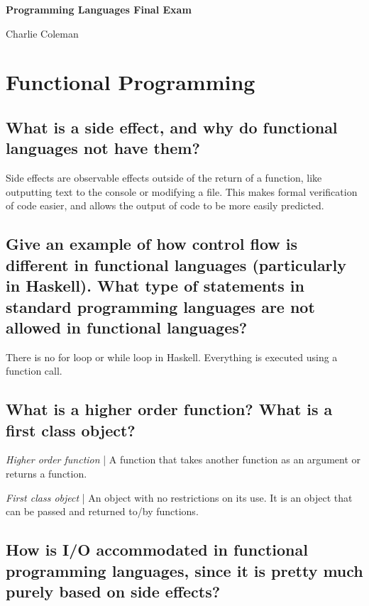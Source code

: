 \documentclass{article}
\newcommand{\define}[1]{\noindent\textit{#1} | }
\begin{document}
\begin{center}
	\begin{large} \textbf{Programming Languages Final Exam} \end{large}
\end{center}

\hfill Charlie Coleman

\section{Functional Programming}

\subsection{What is a side effect, and why do functional languages not have them?}

Side effects are observable effects outside of the return of a function, like outputting text to the console or modifying a file. This makes formal verification of code easier, and allows the output of code to be more easily predicted.

\subsection{Give an example of how control flow is different in functional languages (particularly in Haskell). What type of statements in standard programming languages are not allowed in functional languages?}

There is no for loop or while loop in Haskell. Everything is executed using a function call.

\subsection{What is a higher order function? What is a first class object?}

\define{Higher order function} A function that takes another function as an argument or returns a function.

\define{First class object} An object with no restrictions on its use. It is an object that can be passed and returned to/by functions.

\subsection{How is I/O accommodated in functional programming languages, since it is pretty much purely based on side effects?}
\end{document}
